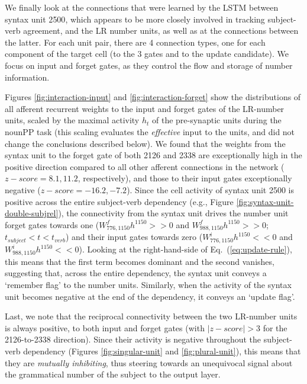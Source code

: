 We finally look at the connections that were learned by the LSTM
between syntax unit \unit{2}{500}, which appears to be more closely involved in
tracking subject-verb agreement, and the LR number units, as well as at
the connections between the latter. For each unit pair, there are 4
connection types, one for each component of the target cell (to the 3
gates and to the update candidate). We focus on input and forget gates, as they control the flow and storage of number information.

Figures \ref{fig:interaction-input} and \ref{fig:interaction-forget}
show the distributions of all afferent recurrent weights to the input
and forget gates of the LR-number units, scaled by the maximal activity
$h_t$ of the pre-synaptic units during the nounPP task (this scaling evaluates
the \textit{effective} input to the units, and did not change the conclusions described below). We found that the weights from the
syntax unit to the forget gate of both \unit{2}{126} and \unit{2}{338}
are exceptionally high in the positive direction compared to all other
afferent connections in the network ($z-score=8.1, 11.2$, respectively), and
those to their input gates exceptionally negative ($z-score=-16.2,
-7.2$). Since the cell activity of syntax unit \unit{2}{500} is
positive across the entire subject-verb dependency (e.g., Figure
\ref{fig:syntax-unit-double-subjrel}), the connectivity from the
syntax unit drives the number unit forget gates towards one
($W^f_{776, 1150}h^{1150}>>0$ and $W^f_{988, 1150}h^{1150}>>0$; $t_{subject}<t<t_{verb}$) and their input gates towards zero
($W^i_{776, 1150}h^{1150}<<0$ and $W^i_{988, 1150}h^{1150}<<0$). Looking at the right-hand-side of
Eq.~(\ref{eq:update-rule}), this means that the first term becomes
dominant and the second vanishes, suggesting that, across the entire
dependency, the syntax unit conveys a `remember flag' to the number
units. Similarly, when the activity of the syntax unit becomes
negative at the end of the dependency, it conveys an `update flag'.

Last, we note that the reciprocal connectivity between the two
LR-number units is always positive, to both input and forget
gates (with $|z-score|>3$ for the \unit{2}{126}-to-\unit{2}{338} direction). Since
their activity is negative throughout the subject-verb dependency
(Figures \ref{fig:singular-unit} and \ref{fig:plural-unit}), this means
that they are \textit{mutually inhibiting}, thus steering towards an
unequivocal signal about the grammatical number of the subject to the
output layer.

